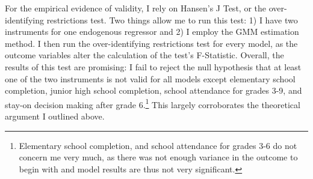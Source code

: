 For the empirical evidence of validity, I rely on Hansen's J Test, or the over-identifying restrictions test. Two things allow me to run this test: 1) I have two instruments for one endogenous regressor and 2) I employ the GMM estimation method. I then run the over-identifying restrictions test for every model, as the outcome variables alter the calculation of the test's F-Statistic. Overall, the results of this test are promising: I fail to reject the null hypothesis that at least one of the two instruments is not valid for all models except elementary school completion, junior high school completion, school attendance for grades 3-9, and stay-on decision making after grade 6.\footnote{Elementary school completion, and school attendance for grades 3-6 do not concern me very much, as there was not enough variance in the outcome to begin with and model results are thus not very significant.} This largely corroborates the theoretical argument I outlined above.



